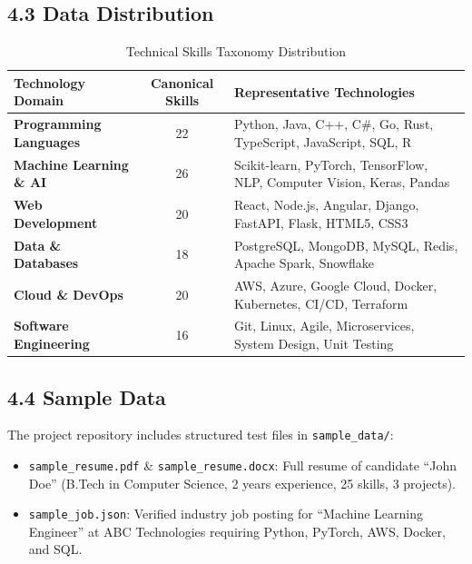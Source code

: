 \documentclass[11pt,a4paper]{article}
\begin{document}
\subsection{4.3 Data Distribution}
\begin{table}[h!]
\centering
\small
\begin{tabularx}{\textwidth}{lcX}
\toprule
\textbf{Technology Domain} & \textbf{Canonical Skills} & \textbf{Representative Technologies} \\
\midrule
\textbf{Programming Languages} & 22 & Python, Java, C++, C\#, Go, Rust, TypeScript, JavaScript, SQL, R \\
\textbf{Machine Learning \& AI} & 26 & Scikit-learn, PyTorch, TensorFlow, NLP, Computer Vision, Keras, Pandas \\
\textbf{Web Development} & 20 & React, Node.js, Angular, Django, FastAPI, Flask, HTML5, CSS3 \\
\textbf{Data \& Databases} & 18 & PostgreSQL, MongoDB, MySQL, Redis, Apache Spark, Snowflake \\
\textbf{Cloud \& DevOps} & 20 & AWS, Azure, Google Cloud, Docker, Kubernetes, CI/CD, Terraform \\
\textbf{Software Engineering} & 16 & Git, Linux, Agile, Microservices, System Design, Unit Testing \\
\bottomrule
\end{tabularx}
\caption{Technical Skills Taxonomy Distribution}
\end{table}

\subsection{4.4 Sample Data}
The project repository includes structured test files in \texttt{sample\_data/}:
\begin{itemize}[noitemsep]
    \item \texttt{sample\_resume.pdf} \& \texttt{sample\_resume.docx}: Full resume of candidate ``John Doe'' (B.Tech in Computer Science, 2 years experience, 25 skills, 3 projects).
    \item \texttt{sample\_job.json}: Verified industry job posting for ``Machine Learning Engineer'' at ABC Technologies requiring Python, PyTorch, AWS, Docker, and SQL.
\end{itemize}

\newpage

\end{document}
